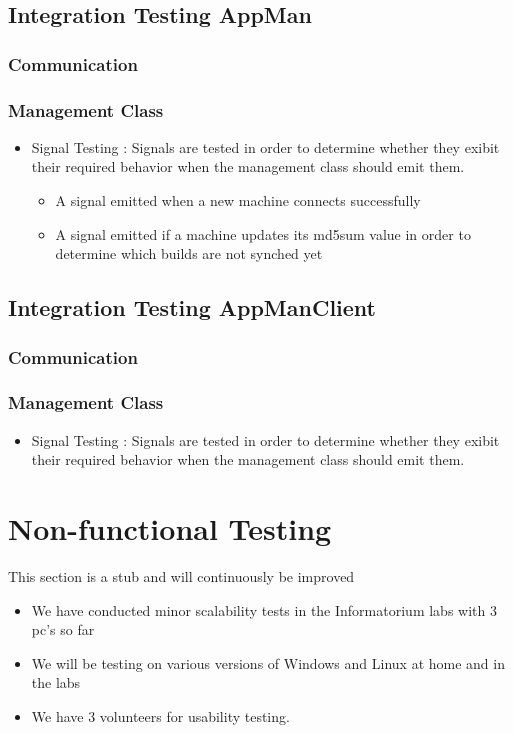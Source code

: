 \documentclass[a4paper,12pt,final]{article}
\begin{document}
\subsection{Integration Testing AppMan}
\subsubsection{Communication}

\subsubsection{Management Class}
\begin{itemize}
\item Signal Testing : Signals are tested in order to determine whether they exibit their required behavior when the management class should emit them.
\begin{itemize}
\item A signal emitted when a new machine connects successfully
\item A signal emitted if a machine updates its md5sum value in order to determine which builds are not synched yet
\end{itemize}
\end{itemize}







\subsection{Integration Testing AppManClient}

\subsubsection{Communication}

\subsubsection{Management Class}
\begin{itemize}
\item Signal Testing : Signals are tested in order to determine whether they exibit their required behavior when the management class should emit them.
\end{itemize}


\section{Non-functional Testing}
This section is a stub and will continuously be improved
\begin{itemize}
\item We have conducted minor scalability tests in the Informatorium labs with 3 pc's so far
\item We will be testing on various versions of Windows and Linux at home and in the labs
\item We have 3 volunteers for usability testing.
\end{itemize}
\end{document}
